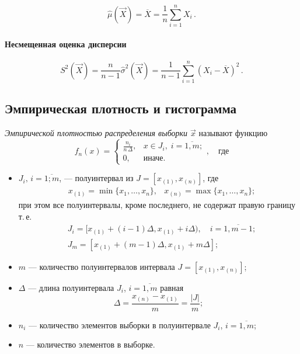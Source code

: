 \documentclass[a4paper, 12pt]{article}
\theoremstyle{definition}
\begin{document}
\begin{equation}
\hat{\mu}(\vec{X}) = \overline{X} = \frac{1}{n} \sum_{i = 1}^{n} X_i\,.
\end{equation}


\paragraph{Несмещенная оценка дисперсии}

\begin{equation}
S^2(\vec{X}) = \frac{n}{n - 1}\hat{\sigma}^2(\vec{X}) = \frac{1}{n - 1}\sum_{i = 1}^{n} (X_i - \overline{X})^2\,.
\end{equation}


\subsection{Эмпирическая плотность и гистограмма}

	\emph{Эмпирической плотностью распределения  выборки $\vec{x}$} называют функцию
	\begin{equation}
	f_n(x) =
	\begin{cases}
	\frac{n_i}{n \, \Delta}, &x \in J_i,\; i = \overline{1, m};\\
	0, &\text{иначе}.
	\end{cases}, \quad \text{где}
	\end{equation}
	\begin{itemize}
		\item $J_i,\, i = \overline{1; m}$, --- полуинтервал из $J = [x_{(1)}, x_{(n)}]$, где 
		\begin{align}
		&x_{(1)} = \min\{ x_1, \dots, x_n \}, &x_{(n)} = \max\{ x_1, \dots, x_n \};
		\end{align}
		при этом все полуинтервалы, кроме последнего, не содержат правую границу т.\,е.
		\begin{align}
		&J_i = [ x_{(1)} + (i-1)\Delta, x_{(1)} + i\Delta), \quad i = \overline{1, m-1};
		\\
		&J_m = [ x_{(1)} + (m-1)\Delta, x_{(1)} + m\Delta];
		\end{align}
		\item $m$ --- количество полуинтервалов интервала $J = [x_{(1)}, x_{(n)}]$;
		\item $\Delta$ --- длина полуинтервала $J_i$, $i = \overline{1, m}$ равная
		\begin{equation}
		\Delta = \frac{x_{(n)} - x_{(1)}}{m} = \frac{|J|}{m};
		\end{equation}
		\item $n_i$ --- количество элементов выборки в полуинтервале $J_i$, $i = \overline{1, m}$;
		\item $n$ --- количество элементов в выборке.
		
	\end{itemize}
\end{document}
